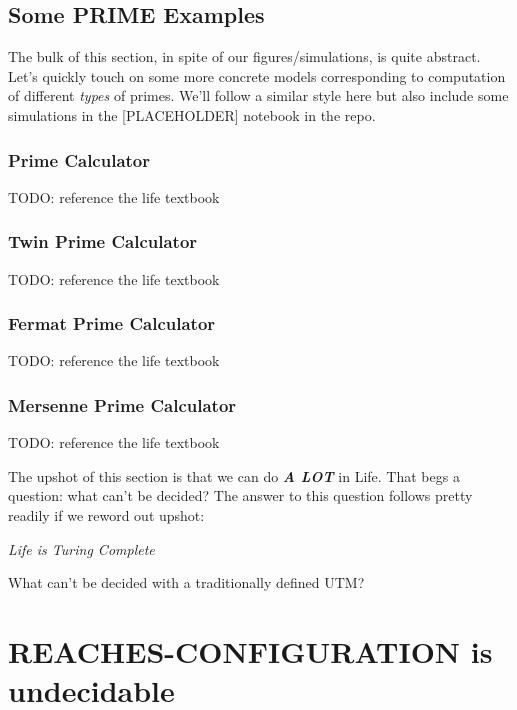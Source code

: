 \documentclass{article}
\theoremstyle{definition}
\theoremstyle{plain}
\theoremstyle{plain}
\begin{document}
\subsection{Some PRIME Examples}

The bulk of this section, in spite of our figures/simulations, is quite abstract. Let's quickly touch on some more concrete models corresponding to computation of different \textit{types} of primes. We'll follow a similar style here but also include some simulations in the [PLACEHOLDER] notebook in the repo.

\subsubsection{Prime Calculator}

TODO: reference the life textbook

\subsubsection{Twin Prime Calculator}

TODO: reference the life textbook

\subsubsection{Fermat Prime Calculator}

TODO: reference the life textbook

\subsubsection{Mersenne Prime Calculator}

TODO: reference the life textbook

The upshot of this section is that we can do \textbf{\textit{A LOT}} in Life. That begs a question: what can't be decided? The answer to this question follows pretty readily if we reword out upshot:

\begin{center}
  \textit{Life is Turing Complete}
\end{center}

What can't be decided with a traditionally defined UTM?

\section{REACHES-CONFIGURATION is undecidable}

\printbibliography
\end{document}
